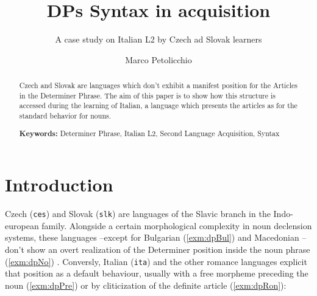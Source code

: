 \documentclass[a4paper,twoside,12pt,chapterprefix=false,listof=flat]{scrartcl}
\title{DPs Syntax in acquisition}
\subtitle{A case study on Italian L2 by Czech ad Slovak learners}
\author{Marco Petolicchio}
\date{}
\theoremstyle{plain} %
\theoremstyle{definition}
\theoremstyle{remark}
\begin{document}
\maketitle
\begin{abstract}
Czech and Slovak are languages which don't exhibit a manifest position
for the Articles in the Determiner Phrase. The aim of this paper is to
show how this structure is accessed during the learning of Italian, a
language which presents the articles as for the standard behavior for
nouns.\par \textbf{Keywords:} Determiner Phrase, Italian L2, Second
Language Acquisition, Syntax
\end{abstract}

{
\setcounter{tocdepth}{2}
\tableofcontents
}
\clearpage

\section{Introduction}\label{introduction}

Czech (\texttt{ces}) and Slovak (\texttt{slk}) are languages of the
Slavic branch in the Indo-european family. Alongside a certain
morphological complexity in noun declension systems, these languages
--except for Bulgarian (\ref{exm:dpBul}) and Macedonian
\citep{wals-37}-- don't show an overt realization of the Determiner
position inside the noun phrase (\ref{exm:dpNo}) \citep{harkins1953}.
Conversly, Italian (\texttt{ita}) and the other romance languages
explicit that position as a default behaviour, usually with a free
morpheme preceding the noun (\ref{exm:dpPre}) or by cliticization of the
definite article (\ref{exm:dpRon}):
\end{document}
